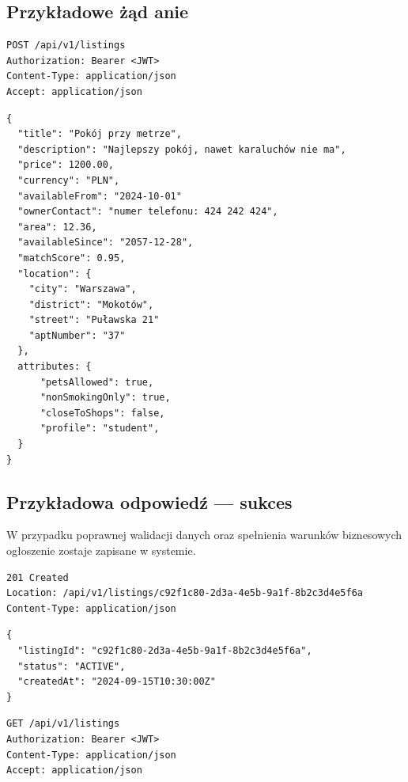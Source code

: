 \documentclass[11pt, a4paper]{article}
\begin{document}
\subsection{Przykładowe żąd anie}

\begin{lstlisting}[style=http,caption={Żądanie HTTP — wystawienie szczegółów ogłoszenia}]
POST /api/v1/listings
Authorization: Bearer <JWT>
Content-Type: application/json
Accept: application/json
\end{lstlisting}

\begin{lstlisting}[style=json,caption={Ciało żądania — wystawienie ogłoszenia}]
{
  "title": "Pokój przy metrze",
  "description": "Najlepszy pokój, nawet karaluchów nie ma",
  "price": 1200.00,
  "currency": "PLN",
  "availableFrom": "2024-10-01"
  "ownerContact": "numer telefonu: 424 242 424",
  "area": 12.36,
  "availableSince": "2057-12-28",
  "matchScore": 0.95,
  "location": {
    "city": "Warszawa",
    "district": "Mokotów",
    "street": "Puławska 21"
    "aptNumber": "37"
  },
  attributes: {
      "petsAllowed": true,
      "nonSmokingOnly": true,
      "closeToShops": false,
      "profile": "student",
  }
}
\end{lstlisting}

\subsection{Przykładowa odpowiedź — sukces}

W przypadku poprawnej walidacji danych oraz spełnienia warunków biznesowych
ogłoszenie zostaje zapisane w systemie.

\begin{lstlisting}[style=http,caption={Odpowiedź HTTP — sukces}]
201 Created
Location: /api/v1/listings/c92f1c80-2d3a-4e5b-9a1f-8b2c3d4e5f6a
Content-Type: application/json
\end{lstlisting}

\begin{lstlisting}[style=json,caption={Ciało odpowiedzi — sukces}]
{
  "listingId": "c92f1c80-2d3a-4e5b-9a1f-8b2c3d4e5f6a",
  "status": "ACTIVE",
  "createdAt": "2024-09-15T10:30:00Z"
}
\end{lstlisting}

\begin{lstlisting}[style=http,caption={Żądanie HTTP — pobranie szczegółów ogłoszenia}]
GET /api/v1/listings
Authorization: Bearer <JWT>
Content-Type: application/json
Accept: application/json
\end{lstlisting}
\end{document}
